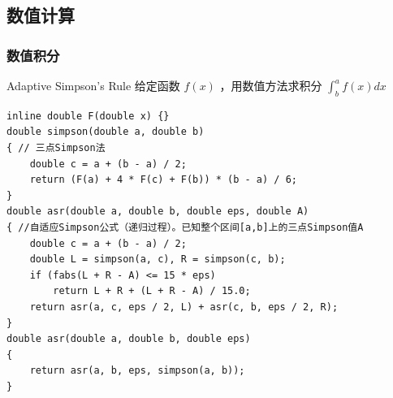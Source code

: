 \documentclass[twoside]{article}
\begin{document}
\subsection{数值计算}
\subsubsection{数值积分}
Adaptive Simpson's Rule
给定函数 $f(x)$ ，用数值方法求积分 $\int_{b}^{a} f(x) dx$
\begin{lstlisting}
inline double F(double x) {}
double simpson(double a, double b)
{ // 三点Simpson法
    double c = a + (b - a) / 2;
    return (F(a) + 4 * F(c) + F(b)) * (b - a) / 6;
}
double asr(double a, double b, double eps, double A)
{ //自适应Simpson公式（递归过程）。已知整个区间[a,b]上的三点Simpson值A
    double c = a + (b - a) / 2;
    double L = simpson(a, c), R = simpson(c, b);
    if (fabs(L + R - A) <= 15 * eps)
        return L + R + (L + R - A) / 15.0;
    return asr(a, c, eps / 2, L) + asr(c, b, eps / 2, R);
}
double asr(double a, double b, double eps)
{
    return asr(a, b, eps, simpson(a, b));
}
\end{lstlisting}
\end{document}
